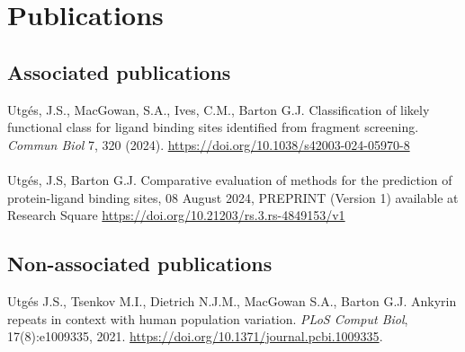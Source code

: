 \chapter*{Publications}

\section*{Associated publications}

Utgés, J.S., MacGowan, S.A., Ives, C.M., Barton G.J. Classification of likely functional class for ligand binding sites identified from fragment screening. \textit{Commun Biol} 7, 320 (2024). \url{https://doi.org/10.1038/s42003-024-05970-8}
\\\\ 
\noindent
Utgés, J.S, Barton G.J. Comparative evaluation of methods for the prediction of protein-ligand binding sites, 08 August 2024, PREPRINT (Version 1) available at Research Square \url{https://doi.org/10.21203/rs.3.rs-4849153/v1}

\section*{Non-associated publications}

Utgés J.S., Tsenkov M.I., Dietrich N.J.M., MacGowan S.A., Barton G.J. Ankyrin repeats in context with human population variation. \textit{PLoS Comput Biol}, 17(8):e1009335, 2021. \url{https://doi.org/10.1371/journal.pcbi.1009335}.